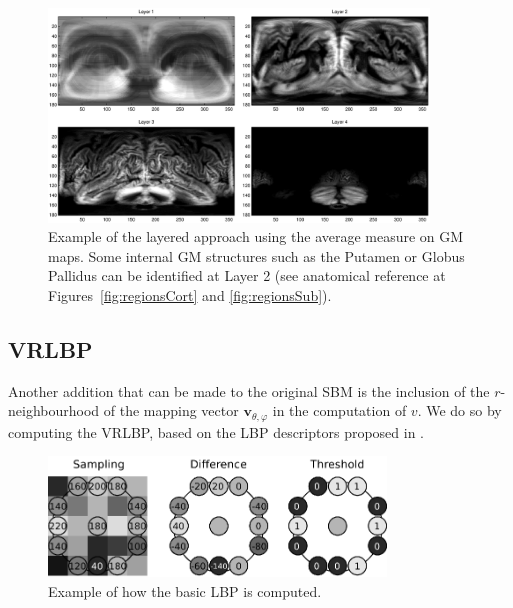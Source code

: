 \begin{figure}[htp]
	\centering
	\includegraphics[width=0.9\textwidth]{Graphics/ch6/layeredAverageGM}
	\caption[Example of the layered approach using the average measure on \acs{GM} maps.]{Example of the layered approach using the average measure on \ac{GM} maps. Some internal \ac{GM} structures such as the Putamen or Globus Pallidus can be identified at Layer 2 (see anatomical reference at Figures~\ref{fig:regionsCort} and \ref{fig:regionsSub}).}
	\label{fig:layeredGM}
\end{figure}

\subsection{\acf{VRLBP}}\label{sec:vrlbp}
Another addition that can be made to the original \ac{SBM} is the inclusion of the $r$-neighbourhood of the mapping vector $\mathbf{v}_{\theta,\varphi}$ in the computation of $v$. We do so by computing the \acf{VRLBP}, based on the \ac{LBP} descriptors proposed in \cite{Ojala1996}. 

\begin{figure}[htp]
	\centering
	\includegraphics[width=0.8\textwidth]{Graphics/ch6/lbpLinear}
	\caption{Example of how the basic \acs{LBP} is computed.}
	\label{fig:lbpBasic}
\end{figure}


